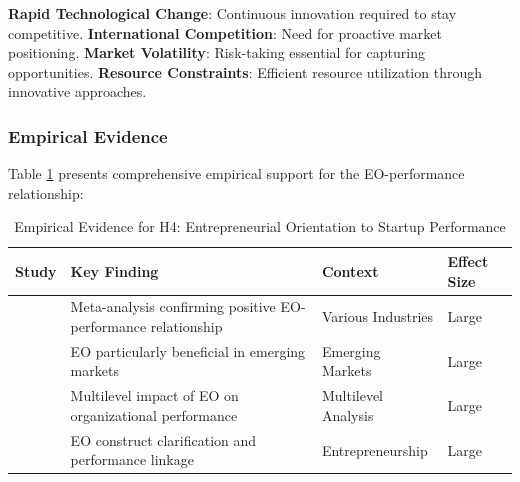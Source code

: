 \documentclass[../Main.tex]{subfiles}
\begin{document}
    \textbf{Rapid Technological Change}: Continuous innovation required to stay competitive. 
    \textbf{International Competition}: Need for proactive market positioning. 
    \textbf{Market Volatility}: Risk-taking essential for capturing opportunities. 
    \textbf{Resource Constraints}: Efficient resource utilization through innovative approaches.

    \subsubsection{Empirical Evidence}
    Table \ref{tab:h4_evidence} presents comprehensive empirical support for the EO-performance relationship:

    \begin{table}[H]
        \centering
        \caption{Empirical Evidence for H4: Entrepreneurial Orientation to Startup Performance}
        \label{tab:h4_evidence}
        \begin{tabular}{|p{3cm}|p{4cm}|p{3cm}|p{2cm}|}
            \hline
            \textbf{Study} & \textbf{Key Finding} & \textbf{Context} & \textbf{Effect Size} \\
            \hline
            \autocite{rauch2009entrepreneurial} & Meta-analysis confirming positive EO-performance relationship & Various Industries & Large \\
            \hline
            \autocite{saeed2014entrepreneurial} & EO particularly beneficial in emerging markets & Emerging Markets & Large \\
            \hline
            \autocite{wales2013entrepreneurial} & Multilevel impact of EO on organizational performance & Multilevel Analysis & Large \\
            \hline
            \autocite{lumpkin1996clarifying} & EO construct clarification and performance linkage & Entrepreneurship & Large \\
            \hline
        \end{tabular}
    \end{table}
\end{document}

